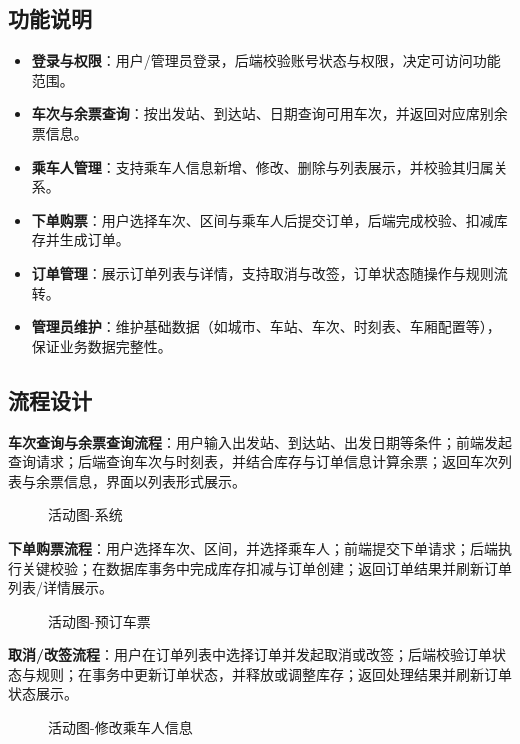 \documentclass{article}
\begin{document}
	\subsection{功能说明}
	\begin{itemize}
		\item \textbf{登录与权限}：用户/管理员登录，后端校验账号状态与权限，决定可访问功能范围。
		\item \textbf{车次与余票查询}：按出发站、到达站、日期查询可用车次，并返回对应席别余票信息。
		\item \textbf{乘车人管理}：支持乘车人信息新增、修改、删除与列表展示，并校验其归属关系。
		\item \textbf{下单购票}：用户选择车次、区间与乘车人后提交订单，后端完成校验、扣减库存并生成订单。
		\item \textbf{订单管理}：展示订单列表与详情，支持取消与改签，订单状态随操作与规则流转。
		\item \textbf{管理员维护}：维护基础数据（如城市、车站、车次、时刻表、车厢配置等），保证业务数据完整性。
	\end{itemize}
	
	\subsection{流程设计}
	\textbf{车次查询与余票查询流程}：用户输入出发站、到达站、出发日期等条件；前端发起查询请求；后端查询车次与时刻表，并结合库存与订单信息计算余票；返回车次列表与余票信息，界面以列表形式展示。
	\begin{figure}[H]
		\centering
		
		\caption{活动图-系统}
	\end{figure}
	
	\textbf{下单购票流程}：用户选择车次、区间，并选择乘车人；前端提交下单请求；后端执行关键校验；在数据库事务中完成库存扣减与订单创建；返回订单结果并刷新订单列表/详情展示。
	\begin{figure}[H]
		\centering
		
		\caption{活动图-预订车票}
	\end{figure}
	
	\textbf{取消/改签流程}：用户在订单列表中选择订单并发起取消或改签；后端校验订单状态与规则；在事务中更新订单状态，并释放或调整库存；返回处理结果并刷新订单状态展示。
	\begin{figure}[H]
		\centering
		
		\caption{活动图-修改乘车人信息}
	\end{figure}
	
\end{document}
